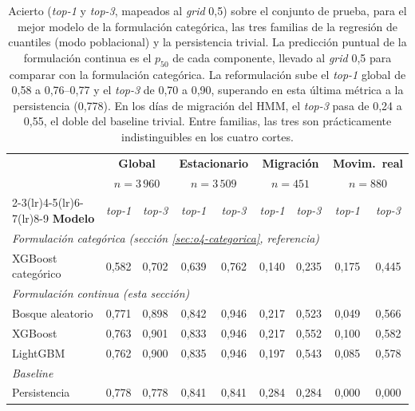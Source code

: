 \begin{table}[H]
  \centering
  \footnotesize
  \begin{tabular}{lcccccccc}
    \toprule
     & \multicolumn{2}{c}{\textbf{Global}} & \multicolumn{2}{c}{\textbf{Estacionario}} & \multicolumn{2}{c}{\textbf{Migración}} & \multicolumn{2}{c}{\textbf{Movim.~real}}\\
     & \multicolumn{2}{c}{$n=3\,960$} & \multicolumn{2}{c}{$n=3\,509$} & \multicolumn{2}{c}{$n=451$} & \multicolumn{2}{c}{$n=880$}\\
    \cmidrule(lr){2-3}\cmidrule(lr){4-5}\cmidrule(lr){6-7}\cmidrule(lr){8-9}
    \textbf{Modelo} & \textit{top-1} & \textit{top-3} & \textit{top-1} & \textit{top-3} & \textit{top-1} & \textit{top-3} & \textit{top-1} & \textit{top-3}\\
    \midrule
    \multicolumn{9}{l}{\emph{Formulación categórica (sección \ref{sec:o4-categorica}, referencia)}}\\
    XGBoost categórico  & 0,582 & 0,702 & 0,639 & 0,762 & 0,140 & 0,235 & 0,175 & 0,445 \\
    \midrule
    \multicolumn{9}{l}{\emph{Formulación continua (esta sección)}}\\
    Bosque aleatorio    & 0,771 & 0,898 & 0,842 & 0,946 & 0,217 & 0,523 & 0,049 & 0,566 \\
    XGBoost             & 0,763 & 0,901 & 0,833 & 0,946 & 0,217 & 0,552 & 0,100 & 0,582 \\
    LightGBM            & 0,762 & 0,900 & 0,835 & 0,946 & 0,197 & 0,543 & 0,085 & 0,578 \\
    \midrule
    \multicolumn{9}{l}{\emph{Baseline}}\\
    Persistencia        & 0,778 & 0,778 & 0,841 & 0,841 & 0,284 & 0,284 & 0,000 & 0,000 \\
    \bottomrule
  \end{tabular}
  \caption[Comparativa entre las dos formulaciones del capítulo y los baselines]{Acierto
  (\textit{top-1} y \textit{top-3}, mapeados al \textit{grid} 0,5\textdegree) sobre el
  conjunto de prueba, para el mejor modelo de la formulación categórica, las tres familias
  de la regresión de cuantiles (modo poblacional) y la persistencia trivial. La predicción
  puntual de la formulación continua es el $p_{50}$ de cada componente, llevado al
  \textit{grid} 0,5\textdegree{} para comparar con la formulación categórica. La
  reformulación sube el \textit{top-1} global de 0,58 a 0,76--0,77 y el \textit{top-3}
  de 0,70 a 0,90, superando en esta última métrica a la persistencia (0,778). En los días
  de migración del HMM, el \textit{top-3} pasa de 0,24 a 0,55, el doble del baseline
  trivial. Entre familias, las tres son prácticamente indistinguibles en los cuatro cortes.}
  \label{tab:o4-q-precision}
\end{table}

